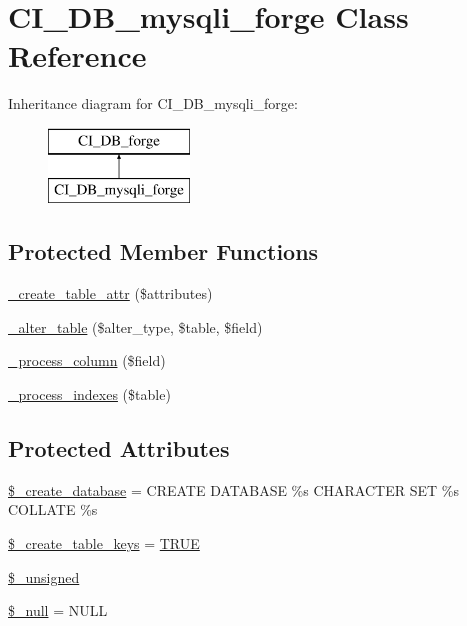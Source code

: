 \hypertarget{class_c_i___d_b__mysqli__forge}{}\section{C\+I\+\_\+\+D\+B\+\_\+mysqli\+\_\+forge Class Reference}
\label{class_c_i___d_b__mysqli__forge}
Inheritance diagram for C\+I\+\_\+\+D\+B\+\_\+mysqli\+\_\+forge\+:\begin{figure}[H]
\begin{center}
\leavevmode
\includegraphics[height=2.000000cm]{class_c_i___d_b__mysqli__forge}
\end{center}
\end{figure}
\subsection*{Protected Member Functions}
\begin{DoxyCompactItemize}
\item 
\mbox{\hyperlink{class_c_i___d_b__mysqli__forge_a10b25326d82f6ddd9af1935e52e42b72}{\+\_\+create\+\_\+table\+\_\+attr}} (\$attributes)
\item 
\mbox{\hyperlink{class_c_i___d_b__mysqli__forge_a41c6cae02f2fda8b429ad0afb9509426}{\+\_\+alter\+\_\+table}} (\$alter\+\_\+type, \$table, \$field)
\item 
\mbox{\hyperlink{class_c_i___d_b__mysqli__forge_a8f38f1c5b5dddecca4befbe393f3f299}{\+\_\+process\+\_\+column}} (\$field)
\item 
\mbox{\hyperlink{class_c_i___d_b__mysqli__forge_ae0bdb4ea3418590d1894c5b621b5ca50}{\+\_\+process\+\_\+indexes}} (\$table)
\end{DoxyCompactItemize}
\subsection*{Protected Attributes}
\begin{DoxyCompactItemize}
\item 
\mbox{\hyperlink{class_c_i___d_b__mysqli__forge_acd23c9a8735806155f1a5d0a87c151f2}{\$\+\_\+create\+\_\+database}} = \textquotesingle{}C\+R\+E\+A\+TE D\+A\+T\+A\+B\+A\+SE \%s C\+H\+A\+R\+A\+C\+T\+ER S\+ET \%s C\+O\+L\+L\+A\+TE \%s\textquotesingle{}
\item 
\mbox{\hyperlink{class_c_i___d_b__mysqli__forge_a73e07acdd35c948ad353903c2827af6e}{\$\+\_\+create\+\_\+table\+\_\+keys}} = \mbox{\hyperlink{constants_8php_ae04a3efe6aa42044f803ee90c2277846}{T\+R\+UE}}
\item 
\mbox{\hyperlink{class_c_i___d_b__mysqli__forge_aae977ae6d61fa183f0b25422b6ddc31c}{\$\+\_\+unsigned}}
\item 
\mbox{\hyperlink{class_c_i___d_b__mysqli__forge_ae58fe6a5104d4a069a49b27533ce808f}{\$\+\_\+null}} = \textquotesingle{}N\+U\+LL\textquotesingle{}
\end{DoxyCompactItemize}
